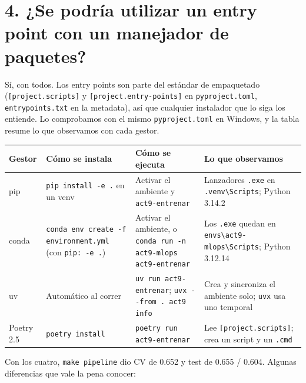 \documentclass[12pt,a4paper]{article}
\renewcommand{\_}{\guionbajo\allowbreak}
\begin{document}
\section{4. ¿Se podría utilizar un entry point con un manejador de paquetes?}

Sí, con todos. Los entry points son parte del estándar de empaquetado (\texttt{[project.scripts]}
y \texttt{[project.entry-\allowbreak points]} en \texttt{pyproject.toml}, \texttt{entry\_points.txt} en la
metadata), así que cualquier instalador que lo siga los entiende. Lo comprobamos con el mismo
\texttt{pyproject.toml} en Windows, y la tabla resume lo que observamos con cada gestor.

\begin{table}[htbp]
\centering
\small
\renewcommand{\arraystretch}{1.25}
\begin{tabular}{|>{\raggedright\arraybackslash}p{1.8cm}|>{\raggedright\arraybackslash}p{3.7cm}|>{\raggedright\arraybackslash}p{4cm}|>{\raggedright\arraybackslash}p{4.1cm}|}
\hline
\textbf{Gestor} & \textbf{Cómo se instala} & \textbf{Cómo se ejecuta} & \textbf{Lo que observamos} \\
\hline
pip & \texttt{pip install -e .} en un venv & Activar el ambiente y \texttt{act9-entrenar} & Lanzadores
\texttt{.exe} en \texttt{.venv\textbackslash Scripts}; Python 3.14.2 \\
\hline
conda & \texttt{conda env create -f environment.yml} (con \texttt{pip: -e .}) & Activar el ambiente, o \texttt{conda run -n act9-mlops
act9-entrenar} & Los \texttt{.exe} quedan en
\texttt{envs\textbackslash\allowbreak act9-mlops\textbackslash\allowbreak Scripts}; Python 3.12.14 \\
\hline
uv & Automático al correr & \texttt{uv run act9-entrenar}; \texttt{uvx -{}-from . act9 info} &
Crea y sincroniza el ambiente solo; \texttt{uvx} usa uno temporal \\
\hline
Poetry 2.5 & \texttt{poetry install} & \texttt{poetry run act9-entrenar} & Lee
\texttt{[project.scripts]}; crea un script y un \texttt{.cmd} \\
\hline
\end{tabular}
\end{table}

Con los cuatro, \texttt{make pipeline} dio CV de 0.652 y test de 0.655 / 0.604. Algunas
diferencias que vale la pena conocer:
\end{document}
